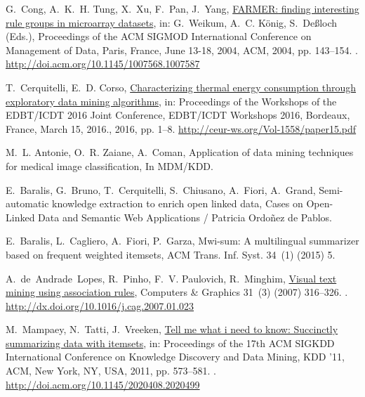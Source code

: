 \documentclass[preprint,review,12pt]{elsarticle}
\begin{document}
\begin{thebibliography}{10}
G.~Cong, A.~K.~H. Tung, X.~Xu, F.~Pan, J.~Yang,
  \href{http://doi.acm.org/10.1145/1007568.1007587}{{FARMER:} finding
  interesting rule groups in microarray datasets}, in: G.~Weikum, A.~C.
  K{\"{o}}nig, S.~De{\ss}loch (Eds.), Proceedings of the {ACM} {SIGMOD}
  International Conference on Management of Data, Paris, France, June 13-18,
  2004, {ACM}, 2004, pp. 143--154.
\newblock \href {http://dx.doi.org/10.1145/1007568.1007587}
  {}.
\newline\urlprefix\url{http://doi.acm.org/10.1145/1007568.1007587}

T.~Cerquitelli, E.~D. Corso,
  \href{http://ceur-ws.org/Vol-1558/paper15.pdf}{Characterizing thermal energy
  consumption through exploratory data mining algorithms}, in: Proceedings of
  the Workshops of the {EDBT/ICDT} 2016 Joint Conference, {EDBT/ICDT} Workshops
  2016, Bordeaux, France, March 15, 2016., 2016, pp. 1--8.
\newline\urlprefix\url{http://ceur-ws.org/Vol-1558/paper15.pdf}

M.~L. Antonie, O.~R. Zaiane, A.~Coman, Application of data mining techniques
  for medical image classification, In MDM/KDD.

E.~Baralis, G.~Bruno, T.~Cerquitelli, S.~Chiusano, A.~Fiori, A.~Grand,
  Semi-automatic knowledge extraction to enrich open linked data, Cases on
  Open-Linked Data and Semantic Web Applications / Patricia Ordoñez de Pablos.

E.~Baralis, L.~Cagliero, A.~Fiori, P.~Garza, Mwi-sum: {A} multilingual
  summarizer based on frequent weighted itemsets, {ACM} Trans. Inf. Syst.
  34~(1) (2015) 5.

A.~de~Andrade~Lopes, R.~Pinho, F.~V. Paulovich, R.~Minghim,
  \href{http://dx.doi.org/10.1016/j.cag.2007.01.023}{Visual text mining using
  association rules}, Computers {\&} Graphics 31~(3) (2007) 316--326.
\newblock \href {http://dx.doi.org/10.1016/j.cag.2007.01.023}
  {}.
\newline\urlprefix\url{http://dx.doi.org/10.1016/j.cag.2007.01.023}

M.~Mampaey, N.~Tatti, J.~Vreeken,
  \href{http://doi.acm.org/10.1145/2020408.2020499}{Tell me what i need to
  know: Succinctly summarizing data with itemsets}, in: Proceedings of the 17th
  ACM SIGKDD International Conference on Knowledge Discovery and Data Mining,
  KDD '11, ACM, New York, NY, USA, 2011, pp. 573--581.
\newblock \href {http://dx.doi.org/10.1145/2020408.2020499}
  {}.
\newline\urlprefix\url{http://doi.acm.org/10.1145/2020408.2020499}


\end{thebibliography}
\end{document}
